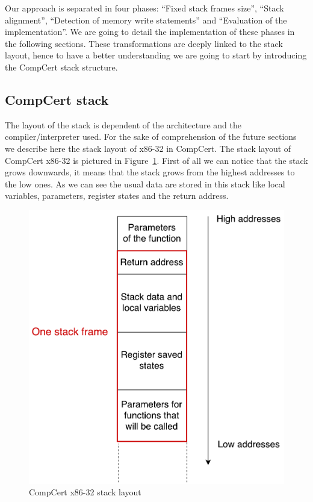 \documentclass[11pt]{sdm}
\begin{document}
	Our approach is separated in four phases: ``Fixed stack frames size'', ``Stack alignment'', ``Detection of memory write statements'' and ``Evaluation of the implementation''. We are going to detail the implementation of these phases in the following sections. These transformations are deeply linked to the stack layout, hence to have a better understanding we are going to start by introducing the CompCert stack structure.

\subsection{CompCert stack}
	The layout of the stack is dependent of the architecture and the compiler/interpreter used. For the sake of comprehension of the future sections we describe here the stack layout of x86-32 in CompCert.
The stack layout of CompCert x86-32 is pictured in Figure~\ref{stack_layout}.
First of all we can notice that the stack grows downwards, it means that the stack grows from the highest addresses to the low ones.
As we can see the usual data are stored in this stack like local variables, parameters, register states and the return address.

\begin{figure}[!ht]
\centering
\includegraphics[scale=0.55]{images/stack_layout.pdf}
\caption{CompCert x86-32 stack layout}
\label{stack_layout}
\end{figure}
\end{document}
